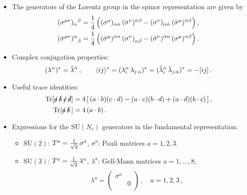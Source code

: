 \begin{itemize}
\begin{align*}
\nn\\ 
[i|\gamma^{\mu}| j\rangle \, \langle l|\gamma_{\mu}|k] &= 2\, [ik]\, \langle lj \rangle\, .
\end{align*}
\item The generators of the Lorentz group in the spinor representation are given by
%
\begin{align*}
(\sigma^{\mu\nu})_\alpha{}^\beta &= \frac{1}{4} \, \Bigl( (\sigma^{\mu})_{\alpha{\dot{\alpha}}}\,  
({\bar\sigma}^{\nu})^{{\dot{\alpha}}\beta} - (\sigma^{\nu})_{\alpha{\dot{\alpha}}}\,  
({\bar\sigma}^{\mu})^{{\dot{\alpha}}\beta} \Bigr) \, , \nonumber \\
({\bar\sigma}^{\mu\nu})^\alpha{}_{\dot{\beta}} &= \frac{1}{4} \, \Bigl( ({\bar\sigma}^{\mu})^{{\dot{\alpha}}\alpha}\,  
({\sigma}^{\nu})_{\alpha{\dot{\beta}}} - ({\bar\sigma}^{\nu})^{{\dot{\alpha}}\alpha}\,  
({\sigma}^{\mu})^{\alpha{\dot{\beta}}} \Bigr) \, .
\end{align*}
%
\item Complex conjugation properties:
%
\begin{align*}
(\lambda^{\alpha})^{\ast}= \tilde\lambda^{{\dot{\alpha}}}\, , \qquad \langle ij\rangle^{\ast}=
(\lambda_{i}^{\alpha}\, \lambda_{j\, \alpha})^{\ast}=
(\tilde\lambda_{i}^{{\dot{\alpha}}}\, \tilde\lambda_{j\, {\dot{\alpha}}})^{\ast}=
-[ij]\, .
\end{align*}
%
\item Useful trace identities:
%
\begin{align*}
\mathop{\mathrm{Tr}}[\slashed{a}\,\slashed{b}\,\slashed{c}\,\slashed{d}]&=4\,[\, ( a\cdot b)(c\cdot d)-
( a\cdot c)(b\cdot d)+( a\cdot d)(b\cdot c)\, ]\, , \nonumber \\ 
\mathop{\mathrm{Tr}}[\slashed{a}\,\slashed{b}\, ] &= 4\,  ( a\cdot b)\, . 
\label{traceids}
\end{align*}
%
\item Expressions for the $\text{SU}(N_c)$ generators in the
fundamental representation:
\begin{itemize}
\item $\text{SU}(2)$: \quad $T^{a}={\textstyle\frac{1}{\sqrt{2}}}\, \sigma^{a}$, \quad $\sigma^{a}$: Pauli matrices $a=1,2,3$.\\
\item $\text{SU}(3)$: \quad $T^{a}={\textstyle\frac{1}{\sqrt{2}}}\, \lambda^{a}$, \quad $\lambda^{a}$: Gell-Mann matrices $a=1,\ldots,8$,\\
\begin{align*}
\begin{aligned}
& \lambda^{a}= \begin{pmatrix} \sigma^{a} & \\ & 0\\ \end{pmatrix}\,, \quad a=1,2,3\,, \\

\end{aligned}
\end{align*}
\end{itemize}
\end{itemize}
